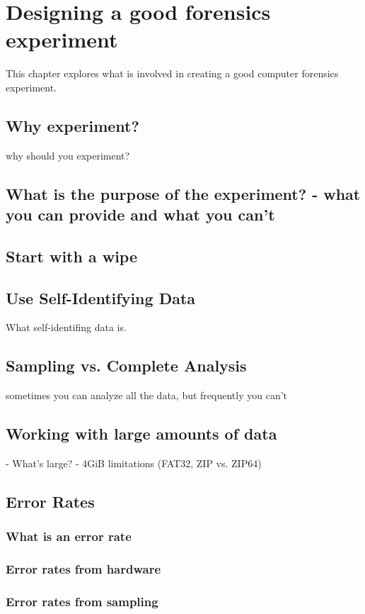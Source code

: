 \chapter{Designing a good forensics experiment}

This chapter explores what is involved in creating a good computer
forensics experiment.

\section{Why experiment?}

why should you experiment?

\section{What is the purpose of the experiment? - what you can provide and what you can't}
\section{Start with a wipe}
\section{Use Self-Identifying Data}

What self-identifing data is.



\section{Sampling vs. Complete Analysis}

sometimes you can analyze all the data, but frequently you can't

\section{Working with large amounts of data}
 - What's large?
 - 4GiB limitations (FAT32, ZIP vs. ZIP64)
\section{Error Rates}
\subsection{What is an error rate}
\subsection{Error rates from hardware}
\subsection{Error rates from sampling}

